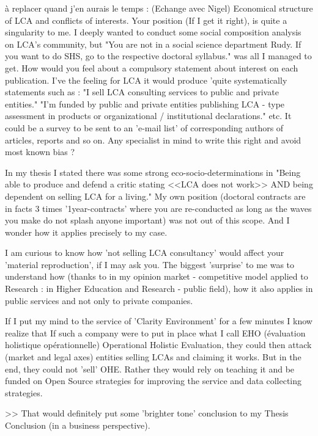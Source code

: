 à replacer quand j'en aurais le temps : (Echange avec Nigel)
Economical structure of LCA and conflicts of interests.
Your position (If I get it right), is quite a singularity to me. I deeply wanted to conduct some social composition analysis on LCA's community, but "You are not in a social science department Rudy. If you want to do SHS, go to the respective doctoral syllabus." was all I managed to get.
How would you feel about a compulsory statement about interest on each publication. I've the feeling for LCA it would produce 'quite systematically statements such as :
"I sell LCA consulting services to public and private entities."
"I'm funded by public and private entities publishing LCA - type assessment in products or organizational / institutional declarations."
etc.
It could be a survey to be sent to an 'e-mail list' of corresponding authors of articles, reports and so on. Any specialist in mind to write this right and avoid most known bias ?


In my thesis I stated there was some strong eco-socio-determinations in "Being able to produce and defend a critic stating <<LCA does not work>> AND being dependent on selling LCA for a living." My own position (doctoral contracts are in facts 3 times '1year-contracts' where you are re-conducted as long as the waves you make do not splash anyone important) was not out of this scope. And I wonder how it applies precisely to my case.

I am curious to know how 'not selling LCA consultancy' would affect your 'material reproduction', if I may ask you.
The biggest 'surprise' to me was to understand how (thanks to in my opinion market - competitive model applied to Research : in Higher Education and Research - public field), how it also applies in public services and not only to private companies.

If I put my mind to the service of 'Clarity Environment' for a few minutes I know realize that If such a company were to put in place what I call EHO (évaluation holistique opérationnelle) Operational Holistic Evaluation, they could then attack (market and legal axes) entities selling LCAs and claiming it works. But in the end, they could not 'sell' OHE. Rather they would rely on teaching it and be funded on Open Source strategies for improving the service and data collecting strategies.

>> That would definitely put some 'brighter tone' conclusion to my Thesis Conclusion (in a business perspective).

